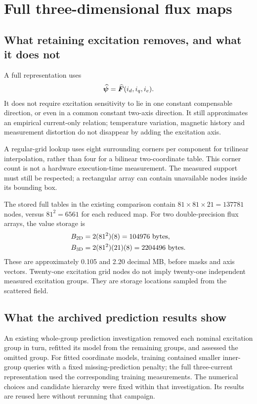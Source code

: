 \section{Full three-dimensional flux maps}
\subsection{What retaining excitation removes, and what it does not}
A full representation uses
\begin{equation}
\widehat{\bm\psi}=\widehat{\bm F}(i_d,i_q,i_e).
\end{equation}
It does not require excitation sensitivity to lie in one constant compensable direction, or even in a common constant two-axis direction. It still approximates an empirical current-only relation; temperature variation, magnetic history and measurement distortion do not disappear by adding the excitation axis.

A regular-grid lookup uses eight surrounding corners per component for trilinear interpolation, rather than four for a bilinear two-coordinate table. This corner count is not a hardware execution-time measurement. The measured support must still be respected; a rectangular array can contain unavailable nodes inside its bounding box.

The stored full tables in the existing comparison contain $81\times81\times21=137781$ nodes, versus $81^2=6561$ for each reduced map. For two double-precision flux arrays, the value storage is
\begin{align}
B_{\rm 2D}&=2(81^2)(8)=104976\ {\rm bytes},\\
B_{\rm 3D}&=2(81^2)(21)(8)=2204496\ {\rm bytes}.
\end{align}
These are approximately 0.105 and 2.20 decimal MB, before masks and axis vectors. Twenty-one excitation grid nodes do not imply twenty-one independent measured excitation groups. They are storage locations sampled from the scattered field.

\subsection{What the archived prediction results show}
An existing whole-group prediction investigation removed each nominal excitation group in turn, refitted its model from the remaining groups, and assessed the omitted group. For fitted coordinate models, training contained smaller inner-group queries with a fixed missing-prediction penalty; the full three-current representation used the corresponding training measurements. The numerical choices and candidate hierarchy were fixed within that investigation. Its results are reused here without rerunning that campaign.

